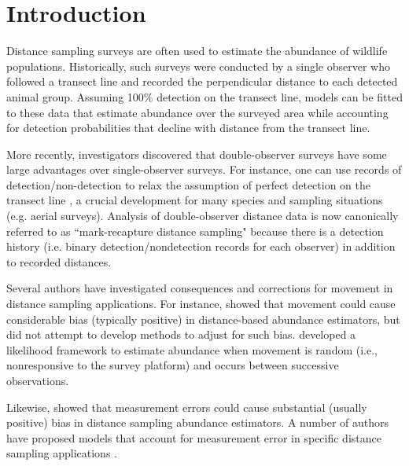 \documentclass[aoas,preprint]{imsart}
\numberwithin{equation}{section}
\theoremstyle{plain}
\begin{document}
\section{Introduction}

Distance sampling surveys \citep{BurnhamEtAl1980,BucklandEtAl2001} are often used to estimate the abundance of wildlife populations.  Historically, such surveys were conducted by a single observer who followed a transect line and recorded the perpendicular distance to each detected animal group.  Assuming 100\% detection on the transect line, models can be fitted to these data that estimate abundance over the surveyed area while accounting for detection probabilities that decline with distance from the transect line.

More recently, investigators discovered that double-observer surveys have some large advantages over single-observer surveys.  For instance, one can use records of detection/non-detection to relax the assumption of perfect detection on the transect line \citep{BorchersEtAl1998}, a crucial development for many species and sampling situations (e.g. aerial surveys).  Analysis of double-observer distance data is now canonically referred to as ``mark-recapture distance sampling" \citep[MRDS; ][]{LaakeBorchers2004} because there is a detection history (i.e. binary detection/nondetection records for each observer) in addition to recorded distances.

Several authors have investigated consequences and corrections for movement in distance sampling applications.  For instance, \citet{GlennieEtAl2015} showed that movement could cause considerable bias (typically positive) in distance-based abundance estimators, but did not attempt to develop methods to adjust for such bias. \citet{HibyLovell1998} developed a likelihood framework to estimate abundance when movement is random (i.e., nonresponsive to the survey platform) and occurs between successive observations.

Likewise, \citet{BorchersEtAl2010} showed that measurement errors could cause substantial (usually positive) bias in distance sampling abundance estimators. A number of authors have proposed models that account for measurement error in specific distance sampling applications \citep[see e.g.][and references therein]{SchwederEtAl1999,BorchersEtAl2010}.
\end{document}
